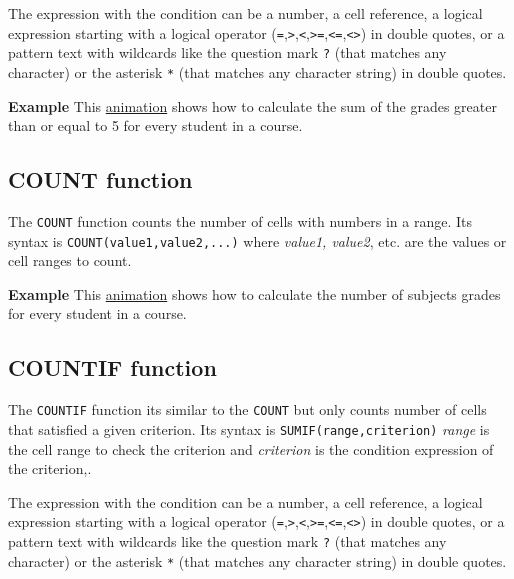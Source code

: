The expression with the condition can be a number, a cell reference, a logical expression starting with a logical
operator
(\texttt{=},\texttt{\textgreater{}},\texttt{\textless{}},\texttt{\textgreater{}=},\texttt{\textless{}=},\texttt{\textless{}\textgreater{}})
in double quotes, or a pattern text with wildcards like the question mark \texttt{?} (that matches any
character) or the asterisk \texttt{*} (that matches any character string) in double quotes. 

\textbf{Example} This \href{http://aprendeconalf.es/office/excel/manual/img/example_function_sumif.gif}{animation} shows how to calculate the sum of the grades greater than or equal to 5 for every student in a course.

\subsection{COUNT function}\hypertarget{count-function}{}\label{count-function}

The \texttt{COUNT} function counts the number of cells with numbers in a range.  Its syntax is
\texttt{COUNT(value1,value2,...)} where \emph{value1, value2}, etc. are the values or cell ranges to count.

\textbf{Example} This \href{http://aprendeconalf.es/office/excel/manual/img/example_function_count.gif}{animation} shows how to calculate the number of subjects grades for every student in a course.

\subsection{COUNTIF function}\hypertarget{countif-function}{}\label{countif-function}

The \texttt{COUNTIF} function its similar to the \texttt{COUNT} but only counts number of cells that satisfied a given criterion. Its syntax is \texttt{SUMIF(range,criterion)} \emph{range} is the cell range to check the criterion and \emph{criterion} is the condition expression of the criterion,.

The expression with the condition can be a number, a cell reference, a logical expression starting with a logical
operator
(\texttt{=},\texttt{\textgreater{}},\texttt{\textless{}},\texttt{\textgreater{}=},\texttt{\textless{}=},\texttt{\textless{}\textgreater{}})
in double quotes, or a pattern text with wildcards like the question mark \texttt{?} (that matches any character)
or the asterisk \texttt{*} (that matches any character string) in double quotes.


